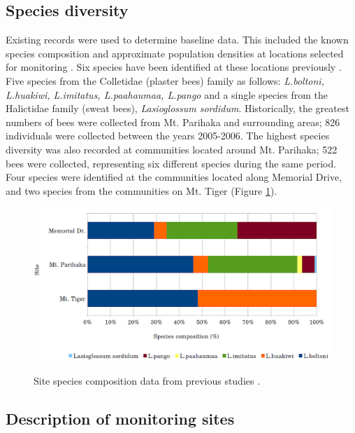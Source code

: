 \subsection{Species diversity}
Existing records were used to determine baseline data. This included the known species composition and approximate population densities at locations selected for monitoring \cite{Hart2004,Hart2007}. Six species have been identified at these locations previously \cite{Hart2004,Hart2007}. Five species from the Colletidae (plaster bees) family as follows:\emph{ L.boltoni, L.huakiwi, L.imitatus, L.paahaumaa, L.pango} and a single species from the Halictidae family (sweat bees), \emph{Lasioglossum sordidum}. Historically, the greatest numbers of bees were collected from Mt. Parihaka and surrounding areas; 826 individuals were collected between the years 2005-2006. The highest species diversity was also recorded at communities located around Mt. Parihaka; 522 bees were collected, representing six different species during the same period. Four species were identified at the communities located along Memorial Drive, and two species from the communities on Mt. Tiger (Figure \ref{fig:site-species}).

\begin{figure}\myfloatalign
\includegraphics[width=0.8\linewidth]{gfx4/site-species} \\
\caption[Site species composition data.]{Site species composition data from previous studies \cite{Hart2004,Hart2007}.}\label{fig:site-species}
\end{figure}

\subsection{Description of monitoring sites}

